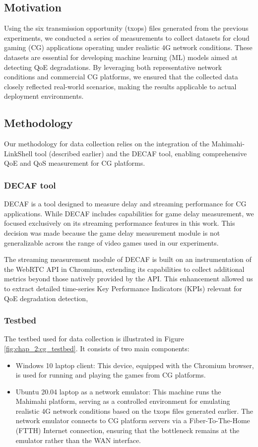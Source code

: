\subsection{Motivation}
Using the six transmission opportunity (txops) files generated from the previous experiments, we conducted a series of measurements to collect datasets for cloud gaming (CG) applications operating under realistic 4G network conditions. These datasets are essential for developing machine learning (ML) models aimed at detecting \ac{QoE} degradations. By leveraging both representative network conditions and commercial CG platforms, we ensured that the collected data closely reflected real-world scenarios, making the results applicable to actual deployment environments.

\subsection{Methodology}
Our methodology for data collection relies on the integration of the Mahimahi-LinkShell tool (described earlier) and the DECAF tool, enabling comprehensive QoE and \ac{QoS} measurement for CG platforms.

\subsubsection{DECAF tool}
DECAF \cite{Iqbal2021DissectingCG} is a tool designed to measure delay and streaming performance for CG applications. While DECAF includes capabilities for game delay measurement, we focused exclusively on its streaming performance features in this work. This decision was made because the game delay measurement module is not generalizable across the range of video games used in our experiments.

The streaming measurement module of DECAF is built on an instrumentation of the WebRTC API in Chromium, extending its capabilities to collect additional metrics beyond those natively provided by the API. This enhancement allowed us to extract detailed time-series Key Performance Indicators (KPIs) relevant for QoE degradation detection,

\subsubsection{Testbed}
The testbed used for data collection is illustrated in Figure \ref{fig:chap_2:cg_testbed}. It consists of two main components:
\begin{itemize}
    \item Windows 10 laptop client: This device, equipped with the Chromium browser, is used for running and playing the games from CG platforms.
    \item Ubuntu 20.04 laptop as a network emulator: This machine runs the Mahimahi platform, serving as a controlled environment for emulating realistic 4G network conditions based on the txops files generated earlier. The network emulator connects to CG platform servers via a Fiber-To-The-Home (FTTH) Internet connection, ensuring that the bottleneck remains at the emulator rather than the \ac{WAN} interface.
\end{itemize}

